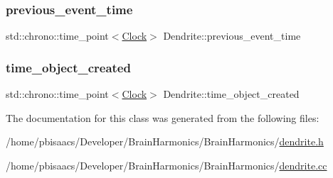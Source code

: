 \mbox{\label{classDendrite_ae4a39c5f211f908eabff9fdd35247f05}} 
\subsubsection{\texorpdfstring{previous\+\_\+event\+\_\+time}{previous\_event\_time}}
{\footnotesize\ttfamily std\+::chrono\+::time\+\_\+point$<$\mbox{\hyperlink{universe_8h_a0ef8d951d1ca5ab3cfaf7ab4c7a6fd80}{Clock}}$>$ Dendrite\+::previous\+\_\+event\+\_\+time\hspace{0.3cm}{\ttfamily [private]}}

\mbox{\label{classDendrite_a21584e5b60195738546123a9ba3c2d6f}} 
\subsubsection{\texorpdfstring{time\+\_\+object\+\_\+created}{time\_object\_created}}
{\footnotesize\ttfamily std\+::chrono\+::time\+\_\+point$<$\mbox{\hyperlink{universe_8h_a0ef8d951d1ca5ab3cfaf7ab4c7a6fd80}{Clock}}$>$ Dendrite\+::time\+\_\+object\+\_\+created\hspace{0.3cm}{\ttfamily [private]}}



The documentation for this class was generated from the following files\+:\begin{DoxyCompactItemize}
\item 
/home/pbisaacs/\+Developer/\+Brain\+Harmonics/\+Brain\+Harmonics/\mbox{\hyperlink{dendrite_8h}{dendrite.\+h}}\item 
/home/pbisaacs/\+Developer/\+Brain\+Harmonics/\+Brain\+Harmonics/\mbox{\hyperlink{dendrite_8cc}{dendrite.\+cc}}\end{DoxyCompactItemize}
